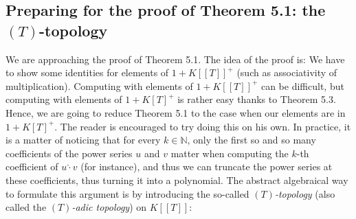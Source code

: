 \documentclass[numbers=enddot,12pt,final,onecolumn,notitlepage]{scrartcl}%
\begin{document}
\subsection{Preparing for the proof of Theorem 5.1: the $\left(  T\right)
$-topology}

We are approaching the proof of Theorem 5.1. The idea of the proof is: We have
to show some identities for elements of $1+K\left[  \left[  T\right]  \right]
^{+}$ (such as associativity of multiplication). Computing with elements of
$1+K\left[  \left[  T\right]  \right]  ^{+}$ can be difficult, but computing
with elements of $1+K\left[  T\right]  ^{+}$ is rather easy thanks to Theorem
5.3. Hence, we are going to reduce Theorem 5.1 to the case when our elements
are in $1+K\left[  T\right]  ^{+}$. The reader is encouraged to try doing this
on his own. In practice, it is a matter of noticing that for every
$k\in\mathbb{N}$, only the first so and so many coefficients of the power
series $u$ and $v$ matter when computing the $k$-th coefficient of
$u\widehat{\cdot}v$ (for instance), and thus we can truncate the power series
at these coefficients, thus turning it into a polynomial. The abstract
algebraical way to formulate this argument is by introducing the so-called
$\left(  T\right)  $\textit{-topology} (also called the $\left(  T\right)
$\textit{-adic topology}) on $K\left[  \left[  T\right]  \right]  $:
\end{document}
